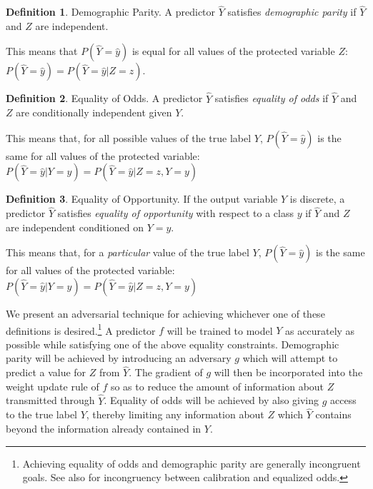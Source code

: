 \documentclass[letterpaper]{article} %
\newcommand{\incite}[1]{\citeauthor{#1} \shortcite{#1}}
\theoremstyle{definition}
\newtheorem{definition}{Definition}
\begin{document}
\begin{definition}{{\sc Demographic Parity.}} 
A predictor $\hat Y$ satisfies {\it demographic parity} if $\hat Y$ and $Z$ are independent. 
\end{definition}

 This means that $P(\hat Y = \hat y)$ is equal for all values of the protected variable $Z$: $P(\hat Y = \hat y) = P(\hat Y = \hat y |Z = z)$.

\begin{definition}{{\sc Equality of Odds.}} 
A predictor $\hat Y$ satisfies {\it equality of odds} if $\hat Y$ and $Z$ are conditionally independent given $Y$. 
\end{definition}

This means that, for all possible values of the true label $Y$, $P(\hat Y = \hat y)$ is the same for all values of the protected variable: $P(\hat Y = \hat y|Y = y) = P(\hat Y = \hat y|Z = z, Y = y)$


\begin{definition}{{\sc Equality of Opportunity.}}  
If the output variable $Y$ is discrete, a predictor $\hat Y$ satisfies {\it equality of opportunity} with respect to a class $y$ if $\hat Y$ and $Z$ are independent conditioned on $Y=y$.
\end{definition}

This means that, for a {\it particular} value of the true label $Y$, $P(\hat Y = \hat y)$ is the same for all values of the protected variable: $P(\hat Y = \hat y|Y = y) = P(\hat Y = \hat y|Z = z, Y = y)$

We present an adversarial technique for achieving whichever one of these definitions is desired.\footnote{Achieving equality of odds and demographic parity are generally incongruent goals.  See also \incite{kleinberg2016inherent} for incongruency between calibration and equalized odds.} 
A predictor $f$ will be trained to model $Y$ as accurately as possible while satisfying one of the above equality constraints.  Demographic parity will be achieved by introducing an adversary $g$ which will attempt to predict a value for $Z$ from $\hat Y$.  The gradient of $g$ will then be incorporated into the weight update rule of $f$ so as to reduce the amount of information about $Z$ transmitted through $\hat Y$.  Equality of odds will be achieved by also giving $g$ access to the true label $Y$, thereby limiting any information about $Z$ which $\hat Y$ contains beyond the information already contained in $Y$. 
\end{document}

